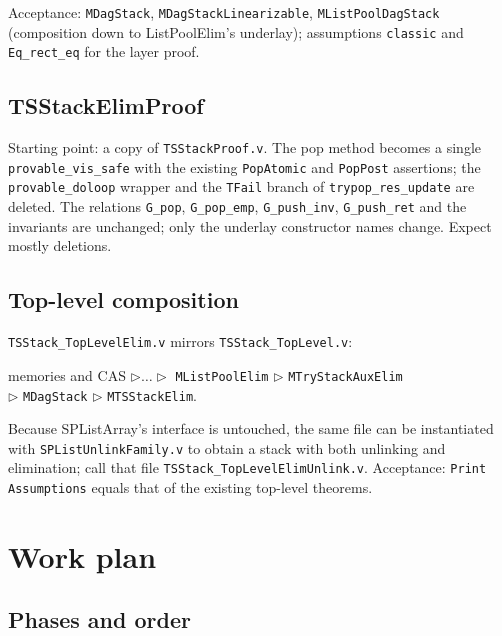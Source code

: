 \documentclass[11pt]{article}
\theoremstyle{definition}
\theoremstyle{remark}
\newcommand{\code}[1]{\texttt{#1}}
\newcommand{\file}[1]{\texttt{#1}}
\begin{document}
Acceptance: \code{MDagStack}, \code{MDagStackLinearizable},
\code{MListPoolDagStack} (composition down to ListPoolElim's underlay);
assumptions \code{classic} and \code{Eq\_rect\_eq} for the layer proof.

\subsection{TSStackElimProof}

Starting point: a copy of \file{TSStackProof.v}. The pop method becomes a
single \code{provable\_vis\_safe} with the existing \code{PopAtomic} and
\code{PopPost} assertions; the \code{provable\_doloop} wrapper and the
\code{TFail} branch of \code{trypop\_res\_update} are deleted. The
relations \code{G\_pop}, \code{G\_pop\_emp}, \code{G\_push\_inv},
\code{G\_push\_ret} and the invariants are unchanged; only the underlay
constructor names change. Expect mostly deletions.

\subsection{Top-level composition}

\file{TSStack\_TopLevelElim.v} mirrors \file{TSStack\_TopLevel.v}:
\begin{center}
memories and CAS $\triangleright \ldots \triangleright$ \code{MListPoolElim} $\triangleright$ \code{MTryStackAuxElim}\\
$\triangleright$ \code{MDagStack} $\triangleright$ \code{MTSStackElim}.
\end{center}
Because SPListArray's interface is untouched, the same file can be
instantiated with \file{SPListUnlinkFamily.v} to obtain a stack with
both unlinking and elimination; call that file
\file{TSStack\_TopLevelElimUnlink.v}.
Acceptance: \code{Print Assumptions} equals that of the existing
top-level theorems.

\section{Work plan}
\label{sec:phases}

\subsection{Phases and order}
\end{document}
